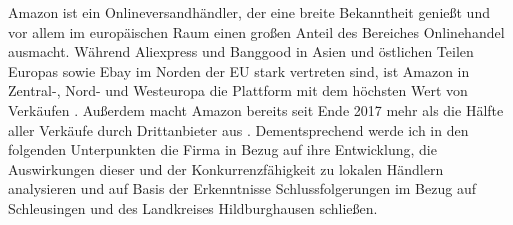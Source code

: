  Amazon ist ein Onlineversandhändler, der eine breite Bekanntheit genießt und vor allem im europäischen Raum einen großen Anteil des Bereiches Onlinehandel ausmacht. 
 Während Aliexpress und Banggood in Asien und östlichen Teilen Europas sowie Ebay im Norden der EU stark vertreten sind, ist Amazon in Zentral-, Nord- und Westeuropa die Plattform mit dem höchsten Wert von Verkäufen \cite[S. 22]{EuroCommerce}. Außerdem macht Amazon bereits seit Ende 2017 mehr als die Hälfte aller Verkäufe durch Drittanbieter aus \cite[S. 25]{Haendlerbund}. Dementsprechend werde ich in den folgenden Unterpunkten die Firma in Bezug auf ihre Entwicklung, die Auswirkungen dieser und der Konkurrenzfähigkeit zu lokalen Händlern analysieren und auf Basis der Erkenntnisse Schlussfolgerungen im Bezug auf Schleusingen und des Landkreises Hildburghausen schließen.
